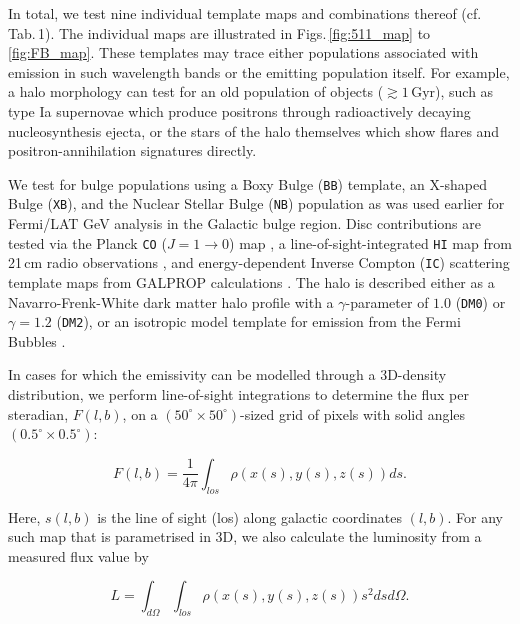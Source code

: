 \documentclass[doublespace,nopageskip]{VTthesis} %
\newcommand{\mrm}[1]{\mathrm{#1}}
\begin{document}
\begin{appendices}
	In total, we test nine individual template maps and combinations thereof (cf. Tab.\,1).
	The individual maps are illustrated in Figs.\,\ref{fig:511_map} to \ref{fig:FB_map}.
	These templates may trace either populations associated with emission in such wavelength bands or the emitting population itself.
	For example, a halo morphology can test for an old population of objects ($\gtrsim 1\,\mrm{Gyr}$), such as type Ia supernovae which produce positrons through radioactively decaying nucleosynthesis ejecta, or the stars of the halo themselves which show flares and positron-annihilation signatures directly.
	
	We test for bulge populations using a Boxy Bulge (\texttt{BB}) template, an X-shaped Bulge (\texttt{XB}), and the Nuclear Stellar Bulge (\texttt{NB}) population as was used earlier \cite[e.g., ][]{Macias2018_LATGeV,Bartels2018_GeVexcess_stars} for Fermi/LAT GeV analysis in the Galactic bulge region.
	Disc contributions are tested via the Planck \texttt{CO} ($J=1 \rightarrow 0$) map \citep{Planck2016_foregrounds}, a line-of-sight-integrated \texttt{HI} map from 21\,cm radio observations \citep{Dickey1990_HI}, and energy-dependent Inverse Compton (\texttt{IC}) scattering template maps from GALPROP calculations \citep{Strong2007_GALPROP}.
	The halo is described either as a Navarro-Frenk-White \citep{Navarro1997_NFW} dark matter halo profile with a $\gamma$-parameter of $1.0$ (\texttt{DM0}) or $\gamma=1.2$ (\texttt{DM2}), or an isotropic model template for emission from the Fermi Bubbles \citep[\texttt{FB}][]{Su2010_fermibubbles}.
	
	In cases for which the emissivity can be modelled through a 3D-density distribution, we perform line-of-sight integrations to determine the flux per steradian, $F(l,b)$, on a $(50^{\circ} \times 50^{\circ})$-sized grid of pixels with solid angles $(0.5^{\circ} \times 0.5^{\circ})$: 
	
	\begin{equation}
		F(l,b) = \frac{1}{4\pi} \int_{los} \rho(x(s),y(s),z(s)) ds\mrm{.}
		\label{eq:los_integral}
	\end{equation}
	
	\noindent Here, $s(l,b)$ is the line of sight (los) along galactic coordinates $(l,b)$.
	For any such map that is parametrised in 3D, we also calculate the luminosity from a measured flux value by 
	
	\begin{equation}
		L = \int_{d\Omega} \int_{los} \rho(x(s),y(s),z(s)) s^2 ds d\Omega\mrm{.}
		\label{eq:luminosity}
	\end{equation}
	

\end{appendices}
\end{document}
